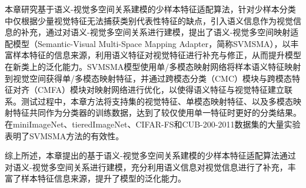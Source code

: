 本章研究基于语义-视觉多空间关系建模的少样本特征适配算法，针对少样本分类中仅根据少量视觉特征无法捕获类别代表性特征的缺点，引入语义信息作为视觉信息的补充，通过对语义-视觉多空间关系进行建模，提出了语义-视觉多空间映射适配模型（Semantic-Visual Multi-Space Mapping Adapter，简称SVMSMA），以丰富样本特征的信息来源，利用语义特征对视觉特征进行补充与修正，从而提升模型在新类上的泛化能力。SVMSMA模型使用单/多模态映射网络将样本语义特征映射到视觉空间获得单/多模态映射特征，并通过跨模态分类（CMC）模块与跨模态特征对齐（CMFA）模块对映射网络进行优化，以使得语义特征与视觉特征建立联系。测试过程中，本章方法将支持集的视觉特征、单模态映射特征、以及多模态映射特征共同作为分类器的训练数据，达到了较仅使用单一特征时更好的分类结果。在miniImageNet、tieredImageNet、CIFAR-FS和CUB-200-2011数据集的大量实验表明了SVMSMA方法的有效性。

综上所述，本章提出的基于语义-视觉多空间关系建模的少样本特征适配算法通过对语义-视觉多空间关系进行建模，充分利用语义信息对视觉信息进行了补充，丰富了样本特征信息来源，提升了模型的泛化能力。
